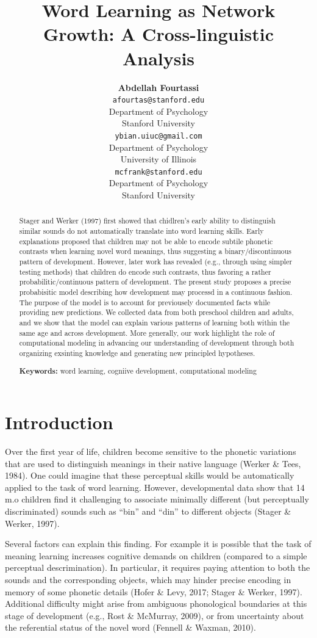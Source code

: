 \documentclass[10pt, letterpaper]{article}
\title{Word Learning as Network Growth: A Cross-linguistic Analysis}
\author{{\large \bf Abdellah Fourtassi} \\ \texttt{afourtas@stanford.edu} \\ Department of Psychology \\ Stanford University \And {\large \bf Yuan Bian} \\ \texttt{ybian.uiuc@gmail.com} \\ Department of Psychology \\ University of Illinois \And {\large \bf Michael C. Frank} \\ \texttt{mcfrank@stanford.edu} \\ Department of Psychology \\ Stanford University}
\begin{document}
\maketitle

\begin{abstract}
Stager and Werker (1997) first showed that chidlren's early ability to
distinguish similar sounds do not automatically translate into word
learning skills. Early explanations proposed that children may not be
able to encode subtile phonetic contrasts when learning novel word
meanings, thus suggesting a binary/discontinuous pattern of development.
However, later work has revealed (e.g., through using simpler testing
methods) that children do encode such contrasts, thus favoring a rather
probabilitic/continuous pattern of development. The present study
proposes a precise probabisitic model describing how development may
processd in a continuous fashion. The purpose of the model is to account
for previousely documented facts while providing new predictions. We
collected data from both preschool children and adults, and we show that
the model can explain various patterns of learning both within the same
age and across development. More generally, our work highlight the role
of computational modeling in advancing our understanding of development
through both organizing exsinting knowledge and generating new
principled hypotheses.

\textbf{Keywords:}
word learning, cogniive development, computational modeling
\end{abstract}

\section{Introduction}\label{introduction}

Over the first year of life, children become sensitive to the phonetic
variations that are used to distinguish meanings in their native
language (Werker \& Tees, 1984). One could imagine that these perceptual
skills would be automatically applied to the task of word learning.
However, developmental data show that 14 m.o children find it
challenging to associate minimally different (but perceptually
discriminated) sounds such as ``bin'' and ``din'' to different objects
(Stager \& Werker, 1997).

Several factors can explain this finding. For example it is possible
that the task of meaning learning increases cognitive demands on
children (compared to a simple perceptual descrimination). In
particular, it requires paying attention to both the sounds and the
corresponding objects, which may hinder precise encoding in memory of
some phonetic details (Hofer \& Levy, 2017; Stager \& Werker, 1997).
Additional difficulty might arise from ambiguous phonological boundaries
at this stage of development (e.g., Rost \& McMurray, 2009), or from
uncertainty about the referential status of the novel word (Fennell \&
Waxman, 2010).
\end{document}
